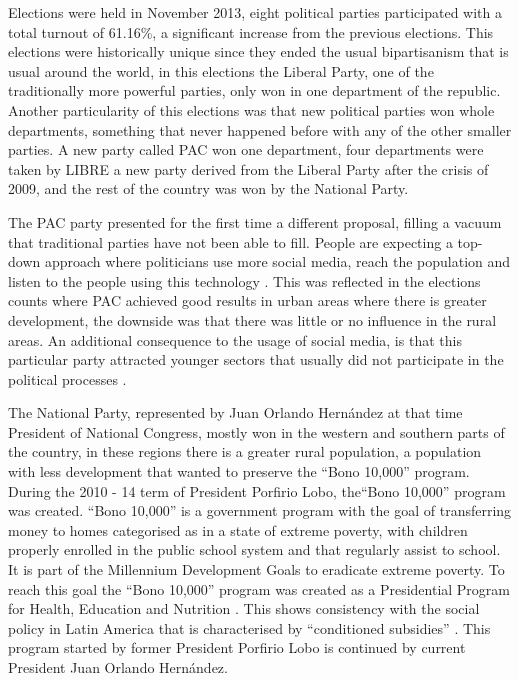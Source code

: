 \documentclass[letterpaper,10pt]{article}
\begin{document}
Elections were held in November 2013, eight political parties participated with a total turnout of 61.16\%, a significant increase from the previous elections. This elections were historically unique since they ended the usual bipartisanism that is usual around the world, in this elections the Liberal Party, one of the traditionally more powerful parties, only won in one department of the republic. Another particularity of this elections was that new political parties won whole departments, something that never happened before with any of the other smaller parties. A new party called PAC won one department, four departments were taken by LIBRE a new party derived from the Liberal Party after the crisis of 2009, and the rest of the country was won by the National Party.

The PAC party presented for the first time a different proposal, filling a vacuum that traditional parties have not been able to fill. People are expecting a top-down approach where politicians use more social media, reach the population and listen to the people using this technology \citep{map2014}. This was reflected in the elections counts where PAC achieved good results in urban areas where there is greater development, the downside was that there was little or no influence in the rural areas. An additional consequence to the usage of social media, is that this particular party attracted younger sectors that usually did not participate in the political processes \citep{romero2014}.

The National Party, represented by Juan Orlando Hernández at that time President of National Congress, mostly won in the western and southern parts of the country, in these regions there is a greater rural population, a population with less development that wanted to preserve the ``Bono 10,000'' program. During the 2010 - 14 term of President Porfirio Lobo, the``Bono 10,000'' program was created. ``Bono 10,000'' is a government program with the goal of transferring money to homes categorised as in a state of extreme poverty, with children properly enrolled in the public school system and that regularly assist to school. It is part of the Millennium Development Goals \citep{mdg2006} to eradicate extreme poverty. To reach this goal the ``Bono 10,000'' program was created as a Presidential Program for Health, Education and Nutrition \citep{bono10k}. This shows consistency with the social policy in Latin America that is characterised by ``conditioned subsidies'' \citep{romero2014}. This program started by former President Porfirio Lobo is continued by current President Juan Orlando Hern\'{a}ndez. 
\end{document}
